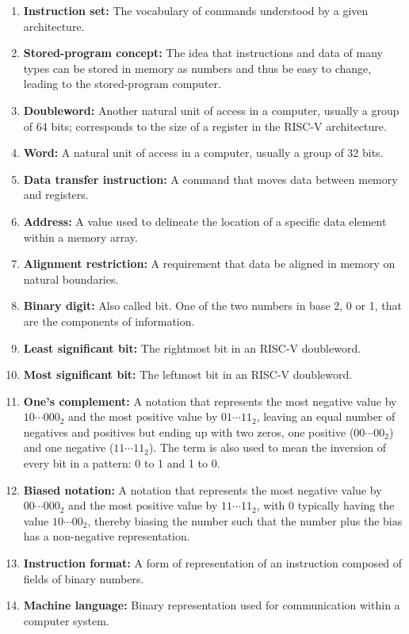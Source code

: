 \documentclass{article}
\begin{document}
\begin{enumerate}[label=\arabic*.]
    \item \textbf{Instruction set:} The vocabulary of commands understood by a given architecture.
    \item \textbf{Stored-program concept:} The idea that instructions and data of many types can be stored in memory as numbers and thus be easy to change, leading to the stored-program computer.
    \item \textbf{Doubleword:} Another natural unit of access in a computer, usually a group of 64 bits; corresponds to the size of a register in the RISC-V architecture.
    \item \textbf{Word:} A natural unit of access in a computer, usually a group of 32 bits.
    \item \textbf{Data transfer instruction:} A command that moves data between memory and registers.
    \item \textbf{Address:} A value used to delineate the location of a specific data element within a memory array.
    \item \textbf{Alignment restriction:} A requirement that data be aligned in memory on natural boundaries.
    \item \textbf{Binary digit:} Also called bit. One of the two numbers in base 2, 0 or 1, that are the components of information.
    \item \textbf{Least significant bit:} The rightmost bit in an RISC-V doubleword.
    \item \textbf{Most significant bit:} The leftmost bit in an RISC-V doubleword.
    \item \textbf{One's complement:} A notation that represents the most negative value by $10\cdots000_2$ and the most positive value by $01\cdots11_2$, leaving an equal number of negatives and positives but ending up with two zeros, one positive ($00\cdots00_2$) and one negative ($11\cdots11_2$). The term is also used to mean the inversion of every bit in a pattern: 0 to 1 and 1 to 0.
    \item \textbf{Biased notation:} A notation that represents the most negative value by $00\cdots000_2$ and the most positive value by $11\cdots11_2$, with 0 typically having the value $10\cdots00_2$, thereby biasing the number such that the number plus the bias has a non-negative representation.
    \item \textbf{Instruction format:} A form of representation of an instruction composed of fields of binary numbers.
    \item \textbf{Machine language:} Binary representation used for communication within a computer system.

\end{enumerate}
\end{document}
